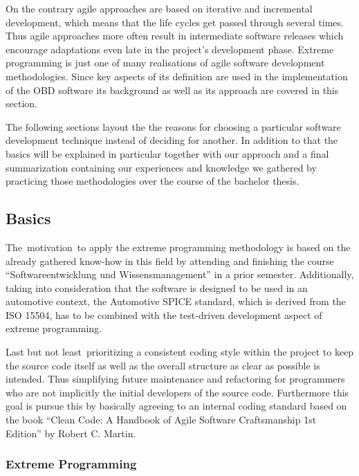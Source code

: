{On the contrary agile approaches are based on iterative and incremental
development, which means that the life cycles get passed through several
times. Thus agile approaches more often result in intermediate software
releases which encourage adaptations even late in the project's
development phase. Extreme programming is just one of many realisations
of agile software development methodologies. Since key aspects of its
definition are used in the implementation of the OBD software its
background as well as its approach are covered in this section. }

{The following sections layout the the reasons for choosing a particular
software development technique instead of deciding for another. In
addition to that the basics will be explained in particular together
with our approach and a final summarization containing our experiences
and knowledge we gathered by practicing those methodologies over the
course of the bachelor thesis.}

\hypertarget{h.qmc1u1ly9e76}{\subsection{\texorpdfstring{{Basics}}{Basics}}\label{h.qmc1u1ly9e76}}

{The}{~motivation}{~to apply }{the extreme programming methodology is
based on the already gathered know-how in this field by attending and
finishing the course ``Softwareentwicklung und Wissensmanagement'' in a
prior semester. }{Additionally, taking into consideration that the
software is designed to be used in an automotive context, the Automotive
SPICE standard, which is derived from the ISO 15504, has to be combined
with the test-driven development aspect of extreme programming.}

{Last but not least}{~prioritizing }{a consistent coding style within
the project to keep the source code itself as well as the overall
structure as clear as possible is intended. Thus simplifying future
maintenance and refactoring for programmers who are not implicitly the
initial developers of the source code. Furthermore this goal is pursue
this by basically agreeing to an internal coding standard based on the
book ``}{Clean Code: A Handbook of Agile Software Craftsmanship 1st
Edition}{'' by Robert C. Martin.}

\hypertarget{h.al3idr34x902}{\subsubsection{\texorpdfstring{{Extreme
Programming}}{Extreme Programming}}\label{h.al3idr34x902}}

